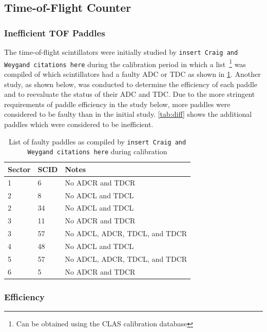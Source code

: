 \subsection{\label{sec:calib.tof}Time-of-Flight Counter}

\subsubsection{Inefficient TOF Paddles}

The time-of-flight scintillators were initially studied by \texttt{insert Craig and Weygand citations here} during the calibration period in which a list~\footnote{Can be obtained using the CLAS calibration database} was compiled of which scintillators had a faulty ADC or TDC as shown in \ref{tab:craigtof}. Another study, as shown below, was conducted to determine the efficiency of each paddle and to reevaluate the status of their ADC and TDC. Due to the more stringent requirements of paddle efficiency in the study below, more paddles were considered to be faulty than in the initial study. \ref{tab:diff} shows the additional paddles which were considered to be inefficient.

\begin{table}
\begin{tabular}{l|l|p{}} %
Sector & SCID & Notes \\
\hline
1 & 6 & No ADCR and TDCR \\
2 & 8 & No ADCL and TDCL \\
2 & 34 & No ADCL and TDCL \\
3 & 11 & No ADCR and TDCR \\
3 & 57 & No ADCL, ADCR, TDCL, and TDCR \\
4 & 48 & No ADCL and TDCL \\
5 & 57 & No ADCL, ADCR, TDCL, and TDCR \\
6 & 5 & No ADCR and TDCR

\end{tabular}
    \caption{List of faulty paddles as compiled by \texttt{insert Craig and Weygand citations here} during calibration}
    \label{tab:craigtof}
\end{table}

\subsubsection{Efficiency}

